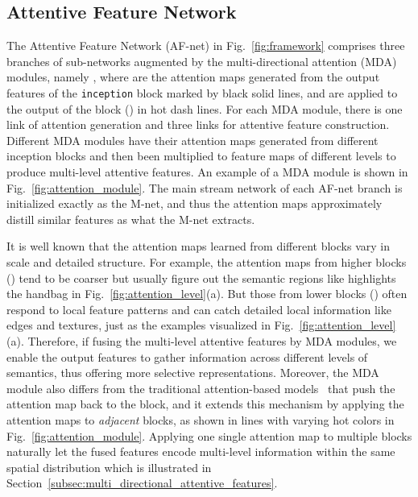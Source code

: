 \documentclass[10pt,twocolumn,letterpaper]{article}
\begin{document}
\vspace{-0.1cm}
\subsection{Attentive Feature Network}
\label{subsec:model_single_branch}

The Attentive Feature Network (AF-net) in Fig.~\ref{fig:framework} comprises three branches of sub-networks augmented by the multi-directional attention (MDA) modules, namely , where  are the attention maps generated from the output features of the \texttt{inception} block  marked by black solid lines, and are applied to the output of the  block () in hot dash lines.
For each MDA module, there is one link of attention generation and three links for attentive feature construction. Different MDA modules have their attention maps generated from different inception blocks and then been multiplied to feature maps of different levels to produce multi-level attentive features. An example of a MDA module  is shown in Fig.~\ref{fig:attention_module}.
The main stream network of each AF-net branch is initialized exactly as the M-net, and thus the attention maps approximately distill similar features as what the M-net extracts.

It is well known that the attention maps learned from different blocks vary in scale and detailed structure.
For example, the attention maps from higher blocks (\eg ) tend to be coarser but usually figure out the semantic regions like  highlights the handbag in Fig.~\ref{fig:attention_level}(a).
But those from lower blocks (\eg ) often respond to local feature patterns and can catch detailed local information like edges and textures, just as the examples visualized in Fig.~\ref{fig:attention_level}(a).
Therefore, if fusing the multi-level attentive features by MDA modules, we enable the output features to gather information across different levels of semantics, thus offering more selective representations.
Moreover, the MDA module also differs from the traditional attention-based models~\cite{newell2016stacked,xu2015show} that push the attention map back to the  block, and it extends this mechanism by applying the attention maps to \textit{adjacent} blocks, as shown in lines with varying hot colors in Fig.~\ref{fig:attention_module}.
Applying one single attention map to multiple blocks naturally let the fused features encode multi-level information within the same spatial distribution which is illustrated in Section~\ref{subsec:multi_directional_attentive_features}.
\end{document}
